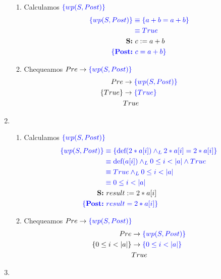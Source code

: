 \documentclass{article}
\begin{document}
\begin{enumerate}[label=\alph*)]
\begin{enumerate}[label=\arabic*.]
	\item Calculamos $\color{blue}\{wp(S,Post)\}$
		\begin{align*}
		\color{blue}\{wp(S,Post)\}
			&\color{blue} \equiv \{a+b=a+b\}\\
			&\color{blue} \equiv True\\  	  
		\textbf{S:} &\  c := a + b\\
		\color{blue}\{\textbf{Post:} &\color{blue}\  c = a + b\}\\
		\end{align*}
	\item Chequeamos $Pre \rightarrow \color{blue}\{wp(S,Post)\}$		
		\begin{align*}
		Pre &\rightarrow \color{blue}\{wp(S,Post)\}\\
		\{True\}&\rightarrow \color{blue}\{True\}\\
		& True 
		\end{align*}
	\end{enumerate}
	\item
	\begin{enumerate}[label=\arabic*.]

	\item Calculamos $\color{blue}\{wp(S,Post)\}$
		\begin{align*}
		\color{blue}\{wp(S,Post)\}
			&\color{blue} \equiv \{\textrm{def}(2*a[i])\wedge_L 2 * a[i]=2 * a[i]\}\\
			&\color{blue} \equiv \textrm{def}(a[i])\wedge_L 0\leq i<|a| \wedge True\\
			&\color{blue} \equiv True \wedge_L 0\leq i<|a|\\
			&\color{blue} \equiv 0\leq i<|a|\\	  
		\textbf{S:} &\  result := 2 * a[i]\\
		\color{blue}\{\textbf{Post:} &\color{blue}\  result = 2 * a[i]\}\\
		\end{align*}
	\item Chequeamos $Pre \rightarrow \color{blue}\{wp(S,Post)\}$		
		\begin{align*}
		Pre &\rightarrow \color{blue}\{wp(S,Post)\}\\
		\{0 \leq i < |a|\}&\rightarrow \color{blue}\{0\leq i<|a|\}\\
		& True 
		\end{align*}
	\end{enumerate}
	\item
	\begin{enumerate}[label=\arabic*.]


\end{enumerate}
\end{enumerate}
\end{document}
